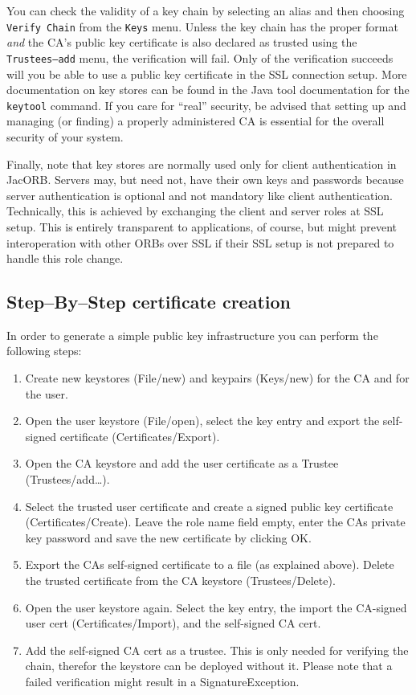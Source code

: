 \documentclass[12pt]{scrbook}
\begin{document}
\bigskip
\centerline{}

You can  check the validity of a  key chain by selecting  an alias and
then choosing {\tt Verify Chain}  from the {\tt Keys} menu. Unless the
key  chain  has  the proper  format  {\em  and}  the CA's  public  key
certificate is also declared  as trusted using the {\tt Trustees--add}
menu, the  verification will fail.  Only of  the verification succeeds
will you be able to use a public key certificate in the SSL connection
setup. More documentation on key stores  can be found in the Java tool
documentation for the {\tt keytool}  command. If you care for ``real''
security,  be advised  that setting  up  and managing  (or finding)  a
properly administered CA is essential for the overall security of your
system.

Finally,  note that  key  stores  are normally  used  only for  client
authentication in JacORB.   Servers may, but need not,  have their own
keys and  passwords because server authentication is  optional and not
mandatory like  client authentication. Technically,  this is achieved
by  exchanging the  client  and server  roles  at SSL  setup. This  is
entirely  transparent to  applications, of  course, but  might prevent
interoperation  with other ORBs  over SSL  if their  SSL setup  is not
prepared to handle this role change.

\subsection{Step--By--Step certificate creation}
In  order to  generate  a  simple public  key  infrastructure you  can
perform the following steps:
\begin{enumerate}
\item Create new keystores (File/new) and keypairs (Keys/new) for the CA
and for the user.
\item  Open the  user keystore (File/open),  select the  key  entry and
export the self-signed certificate (Certificates/Export).
\item  Open  the  CA  keystore  and  add the  user  certificate  as  a
Trustee (Trustees/add\dots).
\item Select the  trusted user certificate and create  a signed public
key certificate (Certificates/Create). Leave the role name field empty,
enter the  CAs private  key password and  save the new  certificate by
clicking OK.
\item Export the  CAs self-signed certificate to a  file (as explained
above).    Delete    the    trusted    certificate   from    the    CA
keystore (Trustees/Delete).
\item Open the  user keystore again. Select the  key entry, the import
the CA-signed  user cert (Certificates/Import), and  the self-signed CA
cert.
\item Add  the self-signed CA cert  as a trustee. This  is only needed
for verifying the chain, therefor the keystore can be deployed without
it.  Please  note  that  a  failed  verification  might  result  in  a
SignatureException.
\end{enumerate}
\end{document}
